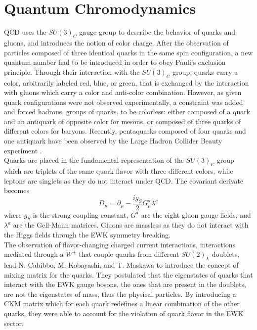   \section{Quantum Chromodynamics}

    QCD uses the $ SU(3)_C $ gauge group to describe the behavior of quarks and gluons, and introduces the notion of color charge. After the observation of particles composed of three identical quarks in the same spin configuration, a new quantum number had to be introduced in order to obey Pauli's exclusion principle. Through their interaction with the $ SU(3)_C $ group, quarks carry a color, arbitrarily labeled red, blue, or green, that is exchanged by the interaction with gluons which carry a color and anti-color combination. However, as given quark configurations were not observed experimentally, a constraint was added and forced hadrons, groups of quarks, to be colorless: either composed of a quark and an antiquark of opposite color for mesons, or composed of three quarks of different colors for baryons. Recently, pentaquarks composed of four quarks and one antiquark have been observed by the Large Hadron Collider Beauty experiment \cite{Aaij:2015tga}. \\

    Quarks are placed in the fundamental representation of the $ SU(3)_C $ group which are triplets of the same quark flavor with three different colors, while leptons are singlets as they do not interact under QCD. The covariant derivate becomes
    \begin{equation}
      D_\mu = \partial_\mu - \frac{i g_S}{2} G^a_\mu \lambda^a
    \end{equation}
    where $ g_S $ is the strong coupling constant, $ G^a $ are the eight gluon gauge fields, and $ \lambda^a $ are the Gell-Mann matrices. Gluons are massless as they do not interact with the Higgs fields through the EWK symmetry breaking. \\

    The observation of flavor-changing charged current interactions, interactions mediated through a $ W^\pm $ that couple quarks from different $ SU(2)_L $ doublets, lead N. Cabibbo, M. Kobayashi, and T. Maskawa to introduce the concept of mixing matrix for the quarks. They postulated that the eigenstates of quarks that interact with the EWK gauge bosons, the ones that are present in the doublets, are not the eigenstates of mass, thus the physical particles. By introducing a CKM matrix which for each quark redefines a linear combination of the other quarks, they were able to account for the violation of quark flavor in the EWK sector.

